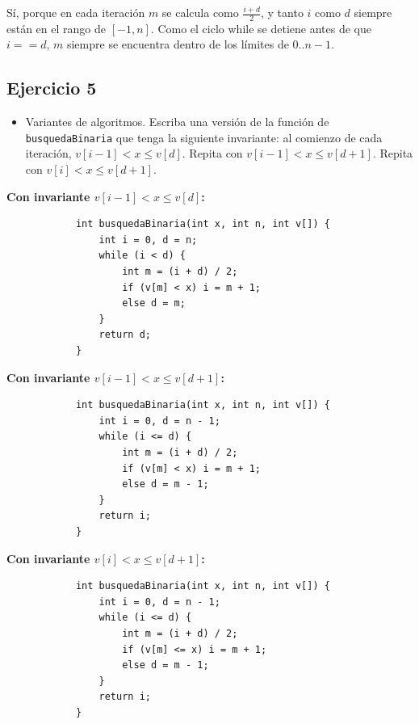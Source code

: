 \documentclass{article}
\begin{document}
        Sí, porque en cada iteración \( m \) se calcula como \( \frac{i + d}{2} \), y tanto \( i \) como \( d \) siempre están en el rango de \([-1, n]\). Como el ciclo while se detiene antes de que \( i == d \), \( m \) siempre se encuentra dentro de los límites de \( 0..n-1 \).

    \subsection{Ejercicio 5}
        \begin{itemize}
            \item Variantes de algoritmos. Escriba una versión de la función de \texttt{busquedaBinaria} que tenga la siguiente invariante: al comienzo de cada iteración, \(v[i-1] < x \leq v[d]\). Repita con \(v[i-1] < x \leq v[d+1]\). Repita con \(v[i] < x \leq v[d+1]\).
        \end{itemize}

        \textbf{Con invariante \( v[i-1] < x \leq v[d] \):}
            \begin{verbatim}
            int busquedaBinaria(int x, int n, int v[]) {
                int i = 0, d = n;
                while (i < d) {
                    int m = (i + d) / 2;
                    if (v[m] < x) i = m + 1;
                    else d = m;
                }
                return d;
            }
            \end{verbatim}
        
        \textbf{Con invariante \( v[i-1] < x \leq v[d+1] \):}
            \begin{verbatim}
            int busquedaBinaria(int x, int n, int v[]) {
                int i = 0, d = n - 1;
                while (i <= d) {
                    int m = (i + d) / 2;
                    if (v[m] < x) i = m + 1;
                    else d = m - 1;
                }
                return i;
            }
            \end{verbatim}
        
        \textbf{Con invariante \( v[i] < x \leq v[d+1] \):}
            \begin{verbatim}
            int busquedaBinaria(int x, int n, int v[]) {
                int i = 0, d = n - 1;
                while (i <= d) {
                    int m = (i + d) / 2;
                    if (v[m] <= x) i = m + 1;
                    else d = m - 1;
                }
                return i;
            }
            \end{verbatim}  
\end{document}
